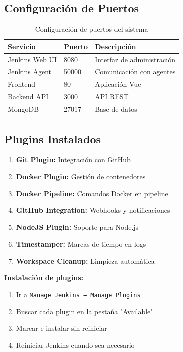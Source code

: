 \documentclass[12pt,a4paper]{article}
\begin{document}
\subsection{Configuración de Puertos}

\begin{table}[h]
\centering
\begin{tabular}{|l|l|l|}
\hline
\textbf{Servicio} & \textbf{Puerto} & \textbf{Descripción} \\
\hline
Jenkins Web UI & 8080 & Interfaz de administración \\
Jenkins Agent & 50000 & Comunicación con agentes \\
Frontend & 80 & Aplicación Vue \\
Backend API & 3000 & API REST \\
MongoDB & 27017 & Base de datos \\
\hline
\end{tabular}
\caption{Configuración de puertos del sistema}
\end{table}

\subsection{Plugins Instalados}

\begin{enumerate}
    \item \textbf{Git Plugin:} Integración con GitHub
    \item \textbf{Docker Plugin:} Gestión de contenedores
    \item \textbf{Docker Pipeline:} Comandos Docker en pipeline
    \item \textbf{GitHub Integration:} Webhooks y notificaciones
    \item \textbf{NodeJS Plugin:} Soporte para Node.js
    \item \textbf{Timestamper:} Marcas de tiempo en logs
    \item \textbf{Workspace Cleanup:} Limpieza automática
\end{enumerate}

\textbf{Instalación de plugins:}
\begin{enumerate}
    \item Ir a \texttt{Manage Jenkins → Manage Plugins}
    \item Buscar cada plugin en la pestaña "Available"
    \item Marcar e instalar sin reiniciar
    \item Reiniciar Jenkins cuando sea necesario
\end{enumerate}
\end{document}
